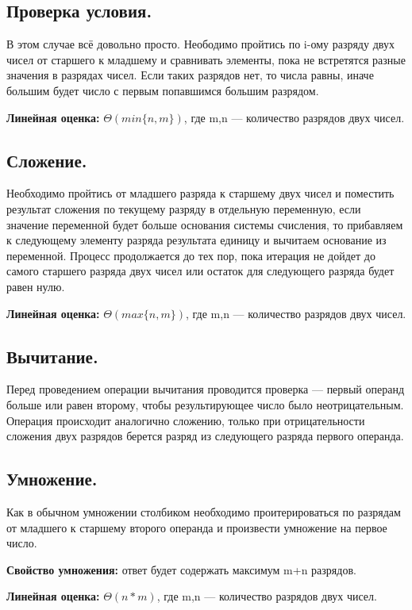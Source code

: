 \documentclass[pdf, unicode, 12pt, a4paper,oneside,fleqn]{article}
\begin{document}
\subsection{Проверка условия.}

В этом случае всё довольно просто. Неободимо пройтись по i-ому разряду двух чисел от старшего к младшему и сравнивать элементы, пока не встретятся разные значения в разрядах чисел. Если таких разрядов нет, то числа равны, иначе большим будет число с первым попавшимся большим разрядом. 

{\bf Линейная оценка: } $\Theta{(min\{n, m\})}$, где m,n — количество разрядов двух чисел. 

\subsection{Сложение.}

Необходимо пройтись от младшего разряда к старшему двух чисел и поместить результат сложения по текущему разряду в отдельную переменную, если значение переменной будет больше основания системы счисления, то прибавляем к следующему элементу разряда результата единицу и вычитаем основание из переменной. Процесс продолжается до тех пор, пока итерация не дойдет до самого старшего разряда двух чисел или остаток для следующего разряда будет равен нулю.

{\bf Линейная оценка: } $\Theta{(max\{n, m\})}$, где m,n — количество разрядов двух чисел. 

\subsection{Вычитание.}
Перед проведением операции вычитания проводится проверка — первый операнд больше или равен второму, чтобы результирующее число было неотрицательным. Операция происходит аналогично сложению, только при отрицательности сложения двух разрядов берется разряд из следующего разряда первого операнда.


\subsection{Умножение.}
Как в обычном умножении столбиком необходимо проитерироваться по разрядам от младшего к старшему второго операнда и произвести умножение на первое число. 

{\bf Свойство умножения: } ответ будет содержать максимум m+n разрядов.


{\bf Линейная оценка: } $\Theta{(n*m)}$, где m,n — количество разрядов двух чисел.
\end{document}
